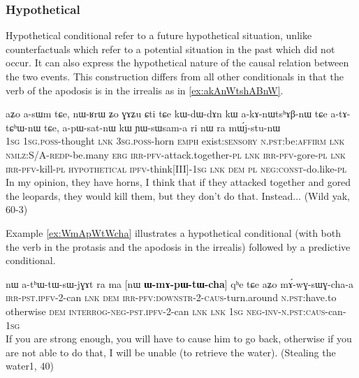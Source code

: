 \documentclass[oldfontcommands,oneside,a4paper,11pt]{article}
\newcommand{\ipa}[1]{{\phon \mbox{#1}}} %
\begin{document}
\subsubsection{Hypothetical}
Hypothetical conditional refer to a future hypothetical situation,   unlike counterfactuals which refer to a potential situation in the past which did not occur. It can also express the hypothetical nature of the causal relation between the two events. This construction differs from all other conditionals in that the verb of the apodosis is in the irrealis as in \ref{ex:akAnWtshABnW}.


\begin{exe}
\ex \label{ex:akAnWtshABnW}
\gll 
 \ipa{aʑo}  	\ipa{a-sɯm}  	\ipa{tɕe,}  	\ipa{nɯ-ʁrɯ}  	\ipa{ʑo}  	\ipa{ɣɤʑu}  	\ipa{ɕti}  	\ipa{tɕe}  \ipa{kɯ-dɯ-dɤn}  	\ipa{kɯ}  \ipa{a-kɤ-nɯtsʰɤβ-nɯ}  	\ipa{tɕe}  	\ipa{a-tɤ-tɕʰɯ-nɯ}  	\ipa{tɕe,}  \ipa{a-pɯ-sat-nɯ}  	\ipa{kɯ}  	\ipa{ɲɯ-sɯsam-a}  \ipa{ri} \ipa{nɯ} \ipa{ra}  	\ipa{mɯ́j-stu-nɯ}  \\
 \textsc{1sg} \textsc{1sg.poss}-thought \textsc{lnk} \textsc{3sg.poss}-horn \textsc{emph} exist:\textsc{sensory} \textsc{n.pst}:be:\textsc{affirm} \textsc{lnk} \textsc{nmlz}:S/A-\textsc{redp}-be.many \textsc{erg} \textsc{irr-pfv}-attack.together-\textsc{pl} \textsc{lnk}  \textsc{irr-pfv}-gore-\textsc{pl} \textsc{lnk}  \textsc{irr-pfv}-kill-\textsc{pl} \textsc{hypothetical} \textsc{ipfv}-think[III]-\textsc{1sg} \textsc{lnk} \textsc{dem} \textsc{pl} \textsc{neg:const}-do.like-\textsc{pl} \\
\glt In my opinion, they have horns, I think that if they attacked together and gored the leopards, they would kill them, but they don't do that. Instead... (Wild yak, 60-3)
\end{exe} 

Example  \ref{ex:WmApWtWcha} illustrates a hypothetical conditional  (with both the verb in the protasis and the apodosis in the irrealis) followed by a predictive conditional.

\begin{exe}
\ex \label{ex:WmApWtWcha}
\gll 
[\textbf{\ipa{a-pɯ-tɯ-cha}}]  	\ipa{nɤ,}  	\ipa{nɯ}  	\ipa{a-tʰɯ-tɯ-sɯ-jɣɤt}  	\ipa{ra}  	\ipa{ma}  	[\ipa{nɯ}  	\textbf{\ipa{ɯ-mɤ-pɯ-tɯ-cha}}]  	\ipa{qʰe}  	\ipa{tɕe}  	\ipa{aʑo}  	\ipa{mɤ́-wɣ-sɯɣ-cha-a}  	  \\
\textsc{irr-pst.ipfv-2}-can \textsc{lnk} \textsc{dem} \textsc{irr-pfv:downstr-2-caus}-turn.around \textsc{n.pst}:have.to otherwise
\textsc{dem}  \textsc{interrog-neg-pst.ipfv}-2-can \textsc{lnk} \textsc{lnk} \textsc{1sg} \textsc{neg-inv-n.pst:caus}-can-\textsc{1sg} \\
\glt If you are strong enough, you will have to cause him to go back, otherwise if you are not able to do that, I will be unable (to retrieve the water). (Stealing the water1, 40)
\end{exe} 
\end{document}
